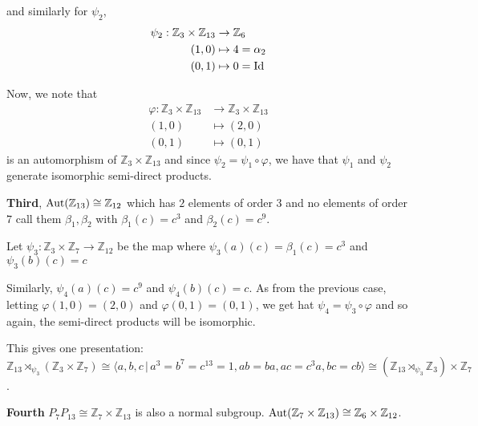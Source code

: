 \documentclass[12pt]{AlgebraQual}
\begin{document}
\begin{solution}
\begin{enumerate}[label=(\alph*)]
    and similarly for $\psi_2$,  \begin{align*}
        \psi_2:\mathbb{Z}_3\times\mathbb{Z}_{13}&\to\mathbb{Z}_6\\
        (1,0)&\mapsto 4=\alpha_2\\
        (0,1)&\mapsto 0=\text{Id}
    \end{align*}

    Now, we note that \begin{align*}
        \varphi:\mathbb{Z}_3\times\mathbb{Z}_{13}&\to\mathbb{Z}_3\times\mathbb{Z}_{13}\\
        (1,0)&\mapsto (2,0)\\
        (0,1)&\mapsto (0,1)
    \end{align*} is an automorphism of $\mathbb{Z}_3\times\mathbb{Z}_{13}$ and since $\psi_2=\psi_1\circ\varphi$, we have that $\psi_1$ and $\psi_2$ generate isomorphic semi-direct products.


    \textbf{Third}, $\text{Aut}(\mathbb{Z}_{13})\cong\mathbb{Z}_{12}$ which has $2$ elements of order $3$ and no elements of order $7$ call them $\beta_1,\beta_2$ with $\beta_1(c)=c^3$ and $\beta_2(c)=c^9$.

    Let $\psi_3:\mathbb{Z}_3\times\mathbb{Z}_7\to\mathbb{Z}_{12}$ be the map where $\psi_3(a)(c)=\beta_1(c)=c^3$ and $\psi_3(b)(c)=c$

    Similarly, $\psi_4(a)(c)=c^9$ and $\psi_4(b)(c)=c$. As from the previous case, letting $\varphi(1,0)=(2,0)$ and $\varphi(0,1)=(0,1)$, we get hat $\psi_4=\psi_3\circ\varphi$ and so again, the semi-direct products will be isomorphic.

    This gives one presentation: $$\mathbb{Z}_{13}\rtimes_{\psi_3}(\mathbb{Z}_3\times\mathbb{Z}_{7})\cong\langle a,b,c\,|\, a^3=b^7=c^{13}=1, ab=ba, ac=c^3a, bc=cb\rangle\cong (\mathbb{Z}_{13}\rtimes_{\psi_3}\mathbb{Z}_3)\times\mathbb{Z}_{7}$$.

    \textbf{Fourth} $P_7P_{13}\cong\mathbb{Z}_7\times\mathbb{Z}_{13}$ is also a normal subgroup. $\text{Aut}(\mathbb{Z}_7\times\mathbb{Z}_{13})\cong\mathbb{Z}_6\times\mathbb{Z}_{12}$.


\end{enumerate}
\end{solution}
\end{document}
